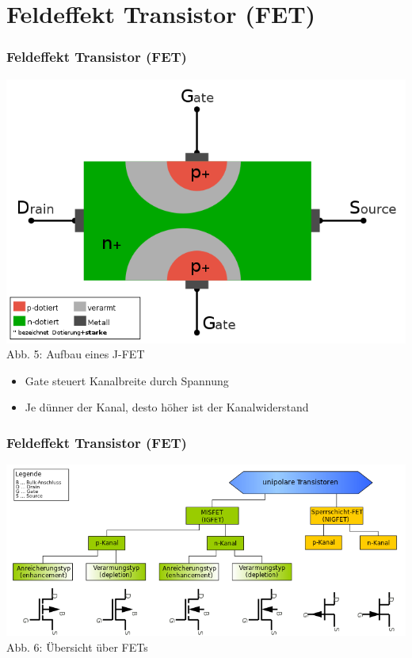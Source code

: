\section*{Feldeffekt Transistor (FET)}
\begin{frame}
\frametitle{Feldeffekt Transistor (FET)}
\begin{center}
	\includegraphics[scale=0.2]{a06/FET-aufbau.png}\\
	Abb. 5: Aufbau eines J-FET \cite{wp}	
\begin{itemize}
	\item Gate steuert Kanalbreite durch Spannung
	\item Je dünner der Kanal, desto höher ist der Kanalwiderstand
\end{itemize}
\end{center}
\end{frame}

\begin{frame}
\frametitle{Feldeffekt Transistor (FET)}
\begin{center}
	\includegraphics[scale=0.35]{a06/FET-overview.png}\\
	Abb. 6: Übersicht über FETs \cite{wp}
\end{center}
\end{frame}

